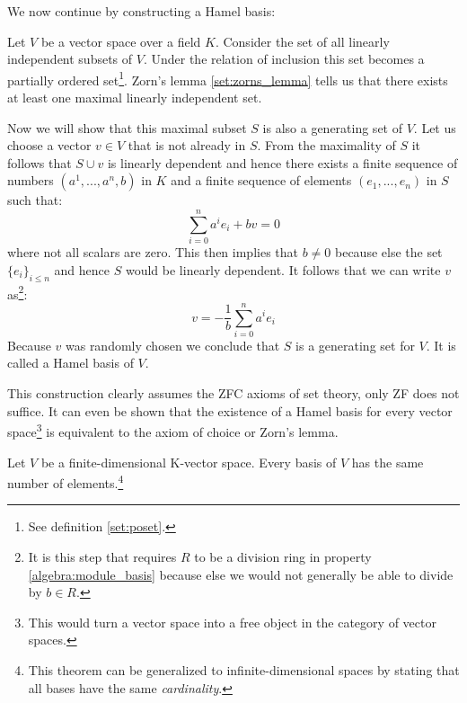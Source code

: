 	We now continue by constructing a Hamel basis:
	\begin{construct}\label{linalgebra:hamel_basis}
		Let $V$ be a vector space over a field $K$. Consider the set of all linearly independent subsets of $V$. Under the relation of inclusion this set becomes a partially ordered set\footnote{See definition \ref{set:poset}.}. Zorn's lemma \ref{set:zorns_lemma} tells us that there exists at least one maximal linearly independent set.
		
		Now we will show that this maximal subset $S$ is also a generating set of $V$. Let us choose a vector $v\in V$ that is not already in $S$. From the maximality of $S$ it follows that $S\cup v$ is linearly dependent and hence there exists a finite sequence of numbers $(a^1, ..., a^n, b)$ in $K$ and a finite sequence of elements $(e_1, ..., e_n)$ in $S$ such that:
		\begin{equation}
			\sum_{i=0}^n a^ie_i + bv = 0
		\end{equation}
		where not all scalars are zero. This then implies that $b\neq0$ because else the set $\{e_i\}_{i\leq n}$ and hence $S$ would be linearly dependent. It follows that we can write $v$ as\footnote{It is this step that requires $R$ to be a division ring in property \ref{algebra:module_basis} because else we would not generally be able to divide by $b\in R$.}:
		\begin{equation}
			v = -\frac{1}{b}\sum_{i=0}^na^ie_i
		\end{equation}
		Because $v$ was randomly chosen we conclude that $S$ is a generating set for $V$. It is called a Hamel basis of $V$.
	\end{construct}
	\begin{remark}
		This construction clearly assumes the ZFC axioms of set theory, only ZF does not suffice. It can even be shown that the existence of a Hamel basis for every vector space\footnote{This would turn a vector space into a free object in the category of vector spaces.} is equivalent to the axiom of choice or Zorn's lemma.
	\end{remark}

        \begin{property}
		Let $V$ be a finite-dimensional K-vector space. Every basis of $V$ has the same number of elements.\footnote{This theorem can be generalized to infinite-dimensional spaces by stating that all bases have the same \textit{cardinality}.}
	\end{property}

